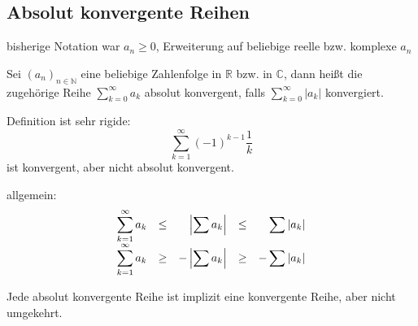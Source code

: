 \subsection{Absolut konvergente Reihen} %
\label{sub:absolut_konvergente_reihen}

bisherige Notation war \( a_n \geq 0 \), Erweiterung auf beliebige reelle bzw. komplexe \( a_n \)

\begin{definition}
	Sei \( (a_n)_{n\in\mathbb{N}} \) eine beliebige Zahlenfolge in \( \mathbb{R} \) bzw. in \( \mathbb{C} \), dann heißt die zugehörige Reihe \( \sum_{k=0}^\infty a_k \) absolut konvergent, falls \( \sum_{k=0}^\infty |a_k| \) konvergiert.
\end{definition}

\begin{note} Definition ist sehr rigide:
\[
	\sum_{k=1}^\infty(-1)^{k-1}\frac{1}{k}
\]
ist konvergent, aber nicht absolut konvergent.
\end{note}

\noindent allgemein:
\[
  \begin{array}{ccrcr}
    \displaystyle\sum_{k=1}^\infty a_k &\leq& \displaystyle\left|\sum a_k\right| &\leq& \displaystyle\sum|a_k| \\
    \displaystyle\sum_{k=1}^\infty a_k &\geq&\displaystyle-\left|\sum a_k\right| &\geq& \displaystyle-\sum|a_k|
  \end{array}
\]

\begin{note}
  Jede absolut konvergente Reihe ist implizit eine konvergente Reihe, aber nicht umgekehrt.
\end{note}

